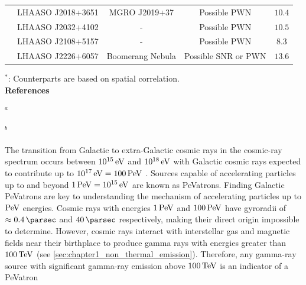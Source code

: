 \begin{table}[h!]
{\begin{threeparttable}
\begin{tabular}{ccccc}
         & LHAASO J2018+3651 & MGRO J2019+37  & Possible PWN & $10.4$ \\
         & LHAASO J2032+4102 & - & Possible PWN & $10.5$ \\
         & LHAASO J2108+5157 & - & Possible PWN & $8.3$ \\
         & LHAASO J2226+6057 & Boomerang Nebula & Possible SNR or PWN & $13.6$ \\
         \hline
    \end{tabular}
    \begin{tablenotes}
	\item $^*$: Counterparts are based on spatial correlation.  \\
	\textbf{References}
	\item $^{a}$ \cite{2018APS..APRB17003B} 
	\item $^{b}$ \cite{2015MNRAS.449.3827K} 
    \end{tablenotes}
    \end{threeparttable}
    }
\end{table}
The transition from Galactic to extra-Galactic cosmic rays in the cosmic-ray spectrum occurs between $10^{15}\,\si{\electronvolt}$ and $10^{18}\,\si{\electronvolt}$ with Galactic cosmic rays expected to contribute up to $10^{17}\,\eV=100\,\PeV$ \citep{2016A&A...595A..33T}. Sources capable of accelerating particles up to and beyond $1\,\PeV=10^{15}\,\eV$ are known as PeVatrons. Finding Galactic PeVatrons are key to understanding the mechanism of accelerating particles up to $\PeV$ energies.
\newpar
Cosmic rays with energies $1\,\PeV$ and $100\,\PeV$ have gyroradii of $\approx 0.4\,\pc$ and $40\,\pc$ respectively, making their direct origin impossible to determine. However, cosmic rays interact with interstellar gas and magnetic fields near their birthplace to produce gamma rays with energies greater than $100\,\TeV$ (see \autoref{sec:chapter1_non_thermal_emission}). Therefore, any gamma-ray source with significant gamma-ray emission above $100\,\TeV$ is an indicator of a PeVatron
\newpar 
